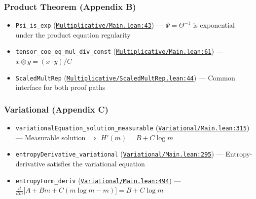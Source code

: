 \documentclass[11pt]{article}
\theoremstyle{definition}
\theoremstyle{remark}
\begin{document}
\subsubsection*{Product Theorem (Appendix B)}
\begin{itemize}
\item \texttt{Psi\_is\_exp} (\href{https://github.com/zariuq/ks-foundations-of-inference/blob/main/KnuthSkilling/Multiplicative/Main.lean\#L43}{\texttt{Multiplicative/Main.lean:43}}) --- $\Psi = \Theta^{-1}$ is exponential under the product equation regularity
\item \texttt{tensor\_coe\_eq\_mul\_div\_const} (\href{https://github.com/zariuq/ks-foundations-of-inference/blob/main/KnuthSkilling/Multiplicative/Main.lean\#L61}{\texttt{Multiplicative/Main.lean:61}}) --- $x \otimes y = (x \cdot y)/C$
\item \texttt{ScaledMultRep} (\href{https://github.com/zariuq/ks-foundations-of-inference/blob/main/KnuthSkilling/Multiplicative/ScaledMultRep.lean\#L44}{\texttt{Multiplicative/ScaledMultRep.lean:44}}) --- Common interface for both proof paths
\end{itemize}

\subsubsection*{Variational (Appendix C)}
\begin{itemize}
\item \texttt{variationalEquation\_solution\_measurable} (\href{https://github.com/zariuq/ks-foundations-of-inference/blob/main/KnuthSkilling/Variational/Main.lean\#L315}{\texttt{Variational/Main.lean:315}}) --- Measurable solution $\Rightarrow$ $H'(m) = B + C \log m$
\item \texttt{entropyDerivative\_variational} (\href{https://github.com/zariuq/ks-foundations-of-inference/blob/main/KnuthSkilling/Variational/Main.lean\#L295}{\texttt{Variational/Main.lean:295}}) --- Entropy-derivative satisfies the variational equation
\item \texttt{entropyForm\_deriv} (\href{https://github.com/zariuq/ks-foundations-of-inference/blob/main/KnuthSkilling/Variational/Main.lean\#L494}{\texttt{Variational/Main.lean:494}}) --- $\frac{d}{dm}\big[A + Bm + C(m\log m - m)\big] = B + C\log m$
\end{itemize}
\end{document}
